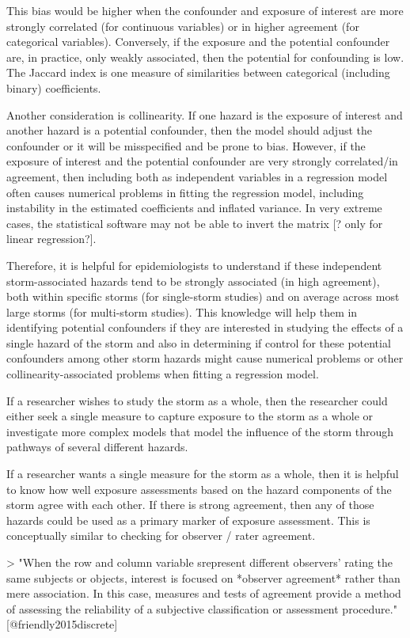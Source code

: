 This bias would be higher when the confounder and exposure of interest are more
strongly correlated (for continuous variables) or in higher agreement (for
categorical variables). Conversely, if the exposure and the potential confounder
are, in practice, only weakly associated, then the potential for confounding is
low. The Jaccard index is one measure of similarities between categorical
(including binary) coefficients.

Another consideration is collinearity. If one hazard is the exposure of interest
and another hazard is a potential confounder, then the model should adjust the
confounder or it will be misspecified and be prone to bias. However, if the
exposure of interest and the potential confounder are very strongly
correlated/in agreement, then including both as independent variables in a
regression model often causes numerical problems in fitting the regression
model, including instability in the estimated coefficients and inflated
variance. In very extreme cases, the statistical software may not be able to
invert the matrix [? only for linear regression?].

Therefore, it is helpful for epidemiologists to understand if these independent
storm-associated hazards tend to be strongly associated (in high agreement),
both within specific storms (for single-storm studies) and on average across
most large storms (for multi-storm studies). This knowledge will help them in
identifying potential confounders if they are interested in studying the effects
of a single hazard of the storm and also in determining if control for these
potential confounders among other storm hazards might cause numerical problems
or other collinearity-associated problems when fitting a regression model.

If a researcher wishes to study the storm as a whole, then the researcher 
could either seek a single measure to capture exposure to the storm as a whole
or investigate more complex models that model the influence of the storm through
pathways of several different hazards. 

If a researcher wants a single measure for the storm as a whole, then it is
helpful to know how well exposure assessments based on the hazard components of
the storm agree with each other. If there is strong agreement, then any of those
hazards could be used as a primary marker of exposure assessment. This is
conceptually similar to checking for observer / rater agreement.

> "When the row and column variable srepresent different observers' rating the
same subjects or objects, interest is focused on *observer agreement* rather
than mere association. In this case, measures and tests of agreement provide a
method of assessing the reliability of a subjective classification or assessment
procedure." [@friendly2015discrete]

